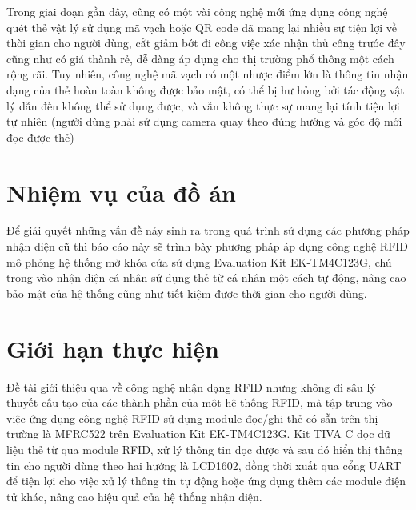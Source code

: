 Trong giai đoạn gần đây, cũng có một vài công nghệ mới ứng dụng công nghệ quét thẻ vật lý sử dụng mã vạch hoặc QR code đã mang lại nhiều sự tiện lợi về thời gian cho người dùng,
cắt giảm bớt đi công việc xác nhận thủ công trước đây cũng như có giá thành rẻ, dễ dàng áp dụng cho thị trường phổ thông một cách rộng rãi.
Tuy nhiên, công nghệ mã vạch có một nhược điểm lớn là thông tin nhận dạng của thẻ hoàn toàn không được bảo mật, có thể bị hư hỏng bởi tác động vật lý dẫn đến không thể sử dụng được, và vẫn không thực sự mang lại tính tiện lợi tự nhiên (người dùng phải sử dụng camera quay theo đúng hướng và góc độ mới đọc được thẻ)

\section{Nhiệm vụ của đồ án}
Để giải quyết những vấn đề nảy sinh ra trong quá trình sử dụng các phương pháp nhận diện cũ thì báo cáo này sẽ trình bày phương pháp áp dụng công nghệ RFID mô phỏng hệ thống mở khóa cửa sử dụng Evaluation Kit EK-TM4C123G,
chú trọng vào nhận diện cá nhân sử dụng thẻ từ cá nhân một cách tự động, nâng cao bảo mật của hệ thống cũng như tiết kiệm được thời gian cho người dùng.

\section{Giới hạn thực hiện}
Đề tài giới thiệu qua về công nghệ nhận dạng RFID nhưng không đi sâu lý thuyết cấu tạo của các thành phần của một hệ thống RFID,
mà tập trung vào việc ứng dụng công nghệ RFID sử dụng module đọc/ghi thẻ có sẵn trên thị trường là MFRC522
trên Evaluation Kit EK-TM4C123G. Kit TIVA C đọc dữ liệu thẻ từ qua module RFID,
xử lý thông tin đọc được và sau đó hiển thị thông tin cho người dùng theo hai hướng là LCD1602,
đồng thời xuất qua cổng UART để tiện lợi cho việc xử lý thông tin tự động hoặc ứng dụng thêm các module điện tử khác, nâng cao hiệu quả của hệ thống nhận diện.
